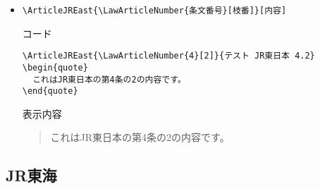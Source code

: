 \documentclass[oneside,10pt,a4paper]{jsarticle}
\begin{document}
\begin{itemize}
\begin{itembox}[l]{コード}
      \end{itembox}
      \begin{itembox}[l]{表示内容}
        [テスト JR東日本 4]
        \begin{quote}
          これはJR東日本の第4条の内容です。
        \end{quote}
      \end{itembox}
    \item \verb|\ArticleJREast{\LawArticleNumber{条文番号}[枝番]}[内容]|
      \begin{itembox}[l]{コード}
        {\footnotesize\begin{verbatim}
\ArticleJREast{\LawArticleNumber{4}[2]}{テスト JR東日本 4.2}
\begin{quote}
  これはJR東日本の第4条の2の内容です。
\end{quote}\end{verbatim}}
      \end{itembox}
      \begin{itembox}[l]{表示内容}
        \begin{quote}
          これはJR東日本の第4条の2の内容です。
        \end{quote}
      \end{itembox}
  \end{itemize}

  \newpage

  \subsection{JR東海}
\end{document}
